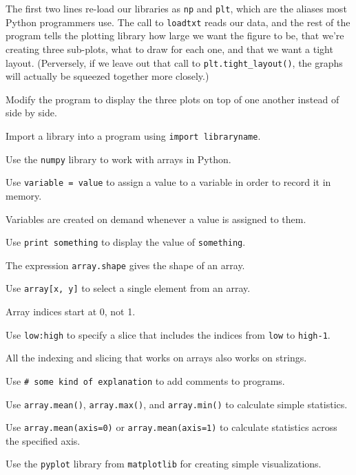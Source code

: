
The first two lines re-load our libraries as \texttt{np} and
\texttt{plt}, which are the aliases most Python programmers use. The
call to \texttt{loadtxt} reads our data, and the rest of the program
tells the plotting library how large we want the figure to be, that
we're creating three sub-plots, what to draw for each one, and that we
want a tight layout. (Perversely, if we leave out that call to
\texttt{plt.tight\_layout()}, the graphs will actually be squeezed
together more closely.)

\begin{challenge}
  Modify the program to display the three plots on top of one another
  instead of side by side.
\end{challenge}

\begin{keypoints}
\begin{swcitemize}
\item
  Import a library into a program using \texttt{import libraryname}.
\item
  Use the \texttt{numpy} library to work with arrays in Python.
\item
  Use \texttt{variable = value} to assign a value to a variable in order
  to record it in memory.
\item
  Variables are created on demand whenever a value is assigned to them.
\item
  Use \texttt{print something} to display the value of
  \texttt{something}.
\item
  The expression \texttt{array.shape} gives the shape of an array.
\item
  Use \texttt{array{[}x, y{]}} to select a single element from an array.
\item
  Array indices start at 0, not 1.
\item
  Use \texttt{low:high} to specify a slice that includes the indices
  from \texttt{low} to \texttt{high-1}.
\item
  All the indexing and slicing that works on arrays also works on
  strings.
\item
  Use \texttt{\# some kind of explanation} to add comments to programs.
\item
  Use \texttt{array.mean()}, \texttt{array.max()}, and
  \texttt{array.min()} to calculate simple statistics.
\item
  Use \texttt{array.mean(axis=0)} or \texttt{array.mean(axis=1)} to
  calculate statistics across the specified axis.
\item
  Use the \texttt{pyplot} library from \texttt{matplotlib} for creating
  simple visualizations.
\end{swcitemize}
\end{keypoints}

